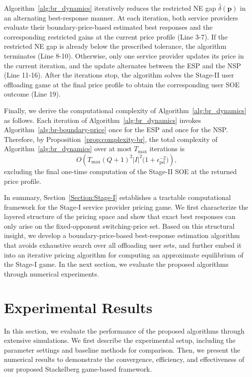 \documentclass[lettersize,journal]{IEEEtran}
\begin{document}
Algorithm~\ref{alg:br_dynamics} iteratively reduces the restricted NE gap $\widehat\delta(\boldsymbol p)$ in an alternating best-response manner. At each iteration, both service providers evaluate their boundary-price-based estimated best responses and the corresponding restricted gains at the current price profile (Line 3-7). If the restricted NE gap is already below the prescribed tolerance, the algorithm terminates (Line 8-10). Otherwise, only one service provider updates its price in the current iteration, and the update alternates between the ESP and the NSP (Line 11-16). After the iterations stop, the algorithm solves the Stage-II user offloading game at the final price profile to obtain the corresponding user SOE outcome (Line 19). 

Finally, we derive the computational complexity of
Algorithm~\ref{alg:br_dynamics} as follows. Each iteration of Algorithm~\ref{alg:br_dynamics} invokes
Algorithm~\ref{alg:br-boundary-price} once for the ESP and once
for the NSP. Therefore, by Proposition~\ref{prop:complexity-br}, the total complexity
of Algorithm~\ref{alg:br_dynamics} over at most $T_{\max}$
iterations is
\[
O\!\left(
T_{\max}(Q+1)^2|I|^2\bigl(1+\epsilon_{\mathrm{pd}}^{-2}\bigr)
\right),
\]
excluding the final one-time computation of the Stage-II SOE at
the returned price profile.

In summary, Section~\ref{Section:Stage-I} establishes a tractable computational framework for the Stage-I service provider pricing game. We first characterize the layered structure of the pricing space and show that exact best responses can only arise on the fixed-opponent switching-price set. Based on this structural insight, we develop a boundary-price-based best-response estimation algorithm that avoids exhaustive search over all offloading user sets, and further embed it into an iterative pricing algorithm for computing an approximate equilibrium of the Stage-I game. In the next section, we evaluate the proposed algorithms through numerical experiments.



\section{Experimental Results}
\label{sec:experiments}

In this section, we evaluate the performance of the proposed algorithms through extensive simulations. We first describe the experimental setup, including the parameter settings and baseline methods for comparison. Then, we present the numerical results to demonstrate the convergence, efficiency, and effectiveness of our proposed Stackelberg game-based framework.
\end{document}
